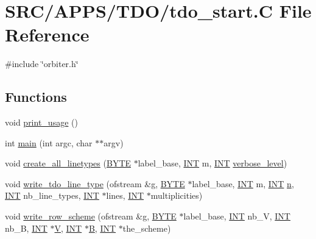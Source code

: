 \hypertarget{tdo__start_8_c}{}\section{S\+R\+C/\+A\+P\+P\+S/\+T\+D\+O/tdo\+\_\+start.C File Reference}
\label{tdo__start_8_c}
{\ttfamily \#include \char`\"{}orbiter.\+h\char`\"{}}\newline
\subsection*{Functions}
\begin{DoxyCompactItemize}
\item 
void \mbox{\hyperlink{tdo__start_8_c_ae5ad5cbeccaedc03a48d3c7eaa803e79}{print\+\_\+usage}} ()
\item 
int \mbox{\hyperlink{tdo__start_8_c_a3c04138a5bfe5d72780bb7e82a18e627}{main}} (int argc, char $\ast$$\ast$argv)
\item 
void \mbox{\hyperlink{tdo__start_8_c_ac4959d0aafbf08044e020e1d09ce8d69}{create\+\_\+all\+\_\+linetypes}} (\mbox{\hyperlink{galois_8h_ab6cc7b4aeb6ea31aba2b3fbfc83ff5e6}{B\+Y\+TE}} $\ast$label\+\_\+base, \mbox{\hyperlink{galois_8h_a09fddde158a3a20bd2dcadb609de11dc}{I\+NT}} m, \mbox{\hyperlink{galois_8h_a09fddde158a3a20bd2dcadb609de11dc}{I\+NT}} \mbox{\hyperlink{simeon_8_c_a818073fbcc2f439e7c56952f67386122}{verbose\+\_\+level}})
\item 
void \mbox{\hyperlink{tdo__start_8_c_a3b504429db90c5c789b91ef9807e1e33}{write\+\_\+tdo\+\_\+line\+\_\+type}} (ofstream \&g, \mbox{\hyperlink{galois_8h_ab6cc7b4aeb6ea31aba2b3fbfc83ff5e6}{B\+Y\+TE}} $\ast$label\+\_\+base, \mbox{\hyperlink{galois_8h_a09fddde158a3a20bd2dcadb609de11dc}{I\+NT}} m, \mbox{\hyperlink{galois_8h_a09fddde158a3a20bd2dcadb609de11dc}{I\+NT}} \mbox{\hyperlink{simeon_8_c_a7f2cd26777ce0ff3fdaf8d02aacbddfb}{n}}, \mbox{\hyperlink{galois_8h_a09fddde158a3a20bd2dcadb609de11dc}{I\+NT}} nb\+\_\+line\+\_\+types, \mbox{\hyperlink{galois_8h_a09fddde158a3a20bd2dcadb609de11dc}{I\+NT}} $\ast$lines, \mbox{\hyperlink{galois_8h_a09fddde158a3a20bd2dcadb609de11dc}{I\+NT}} $\ast$multiplicities)
\item 
void \mbox{\hyperlink{tdo__start_8_c_a9c96af0bbb14c77f93ad10189cc53f29}{write\+\_\+row\+\_\+scheme}} (ofstream \&g, \mbox{\hyperlink{galois_8h_ab6cc7b4aeb6ea31aba2b3fbfc83ff5e6}{B\+Y\+TE}} $\ast$label\+\_\+base, \mbox{\hyperlink{galois_8h_a09fddde158a3a20bd2dcadb609de11dc}{I\+NT}} nb\+\_\+V, \mbox{\hyperlink{galois_8h_a09fddde158a3a20bd2dcadb609de11dc}{I\+NT}} nb\+\_\+B, \mbox{\hyperlink{galois_8h_a09fddde158a3a20bd2dcadb609de11dc}{I\+NT}} $\ast$\mbox{\hyperlink{srg_8_c_af40a326b23c68a27cebe60f16634a2cb}{V}}, \mbox{\hyperlink{galois_8h_a09fddde158a3a20bd2dcadb609de11dc}{I\+NT}} $\ast$\mbox{\hyperlink{costas_8_c_ad1f767566c3189fb90e9cffcc5dd4680}{B}}, \mbox{\hyperlink{galois_8h_a09fddde158a3a20bd2dcadb609de11dc}{I\+NT}} $\ast$the\+\_\+scheme)
$$
\end{DoxyCompactItemize}

